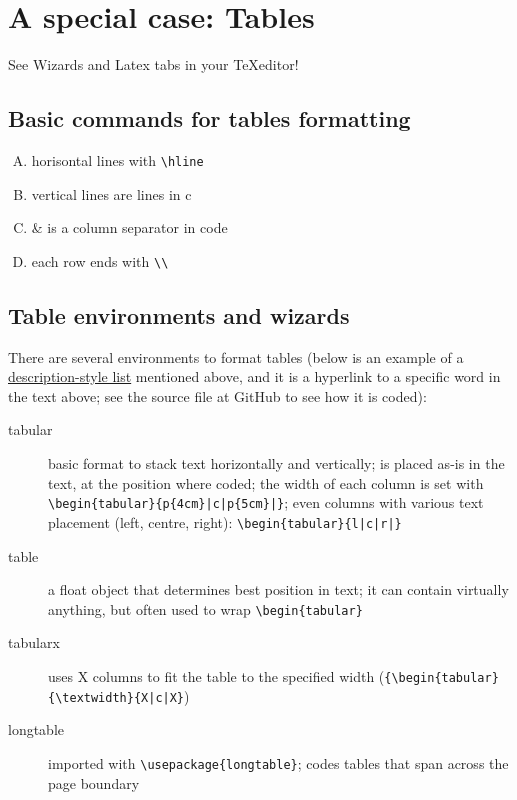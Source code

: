 \documentclass[a4paper,11pt]{article}
\begin{document}
\section{A special case: Tables}\label{sec:tabs}

See Wizards and Latex tabs in your \TeX editor!

\subsection{Basic commands for tables formatting}
\begin{enumerate}[A)]
	\item horisontal lines with \verb|\hline|
	\item vertical lines are lines in c%
	\item \& is a column separator in code
	\item each row ends with \verb|\\|
\end{enumerate}

\medskip

\subsection{Table environments and wizards}

There are several environments to format tables (below is an example of a \hyperlink{wd:desc}{description-style list} mentioned above, and it is a hyperlink to a specific word in the text above; see the source file at GitHub to see how it is coded):
\setlength\fboxsep{3pt} %
\setlength\fboxrule{1pt} %
\begin{description}
	\item[tabular] basic format to stack text horizontally and vertically; is placed as-is in the text, at the position where coded; the width of each column is set with \verb-\begin{tabular}{p{4cm}|c|p{5cm}|}-; even columns with various text placement (left, centre, right): \verb-\begin{tabular}{l|c|r|}-
	\item[table] a float object tha\usetikzlibrary{calc, positioning, shapes.arrows}t determines best position in text; it can contain virtually anything, but often used to wrap \verb|\begin{tabular}|
	\item[tabularx] uses X columns to fit the table to the specified width (\verb-{\begin{tabular}{\textwidth}{X|c|X}-)
	\item[longtable] imported with \verb|\usepackage{longtable}|; codes tables that span across the page boundary

\end{description}
\end{document}
